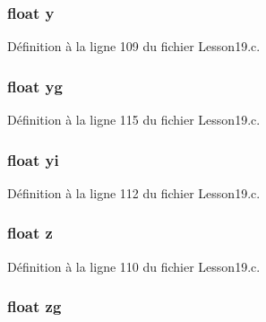 \hypertarget{structparticles_aa4f0d3eebc3c443f9be81bf48561a217}{}
\subsubsection[{y}]{\setlength{\rightskip}{0pt plus 5cm}float y}\label{structparticles_aa4f0d3eebc3c443f9be81bf48561a217}


Définition à la ligne 109 du fichier Lesson19.\+c.

\hypertarget{structparticles_ab51c8c36335423b174b120c9717fbd7f}{}
\subsubsection[{yg}]{\setlength{\rightskip}{0pt plus 5cm}float yg}\label{structparticles_ab51c8c36335423b174b120c9717fbd7f}


Définition à la ligne 115 du fichier Lesson19.\+c.

\hypertarget{structparticles_a2700b8bdea86358af21700a5694ed3a9}{}
\subsubsection[{yi}]{\setlength{\rightskip}{0pt plus 5cm}float yi}\label{structparticles_a2700b8bdea86358af21700a5694ed3a9}


Définition à la ligne 112 du fichier Lesson19.\+c.

\hypertarget{structparticles_af73583b1e980b0aa03f9884812e9fd4d}{}
\subsubsection[{z}]{\setlength{\rightskip}{0pt plus 5cm}float z}\label{structparticles_af73583b1e980b0aa03f9884812e9fd4d}


Définition à la ligne 110 du fichier Lesson19.\+c.

\hypertarget{structparticles_a7eba9960b5039b751f3df38af74fd9c5}{}
\subsubsection[{zg}]{\setlength{\rightskip}{0pt plus 5cm}float zg}\label{structparticles_a7eba9960b5039b751f3df38af74fd9c5}


